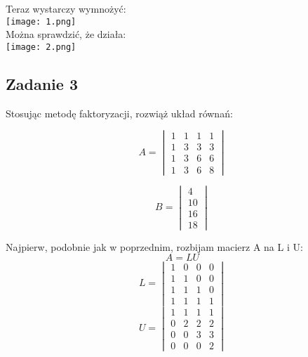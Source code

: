 \documentclass[a4paper]{article}
\begin{document}
Teraz wystarczy wymnożyć:\\
\texttt{[image: 1.png]}\\
Można sprawdzić, że działa:\\
\texttt{[image: 2.png]}


\clearpage
\subsection*{Zadanie 3}
Stosując metodę faktoryzacji, rozwiąż układ równań:

$$A=\begin{vmatrix}
1 & 1 & 1 & 1\\
1 & 3 & 3 & 3\\
1 & 3 & 6 & 6\\
1 & 3 & 6 & 8
\end{vmatrix}$$

$$B=\begin{vmatrix}
4\\
10\\
16\\
18
\end{vmatrix}$$



Najpierw, podobnie jak w poprzednim, rozbijam macierz A na L i U:
$$A=LU$$
$$L=\begin{vmatrix}
1 & 0 & 0 & 0\\
1 & 1 & 0 & 0\\
1 & 1 & 1 & 0\\
1 & 1 & 1 & 1
\end{vmatrix}$$
$$U=\begin{vmatrix}
1 & 1 & 1 & 1\\
0 & 2 & 2 & 2\\
0 & 0 & 3 & 3\\
0 & 0 & 0 & 2
\end{vmatrix} $$
\end{document}
